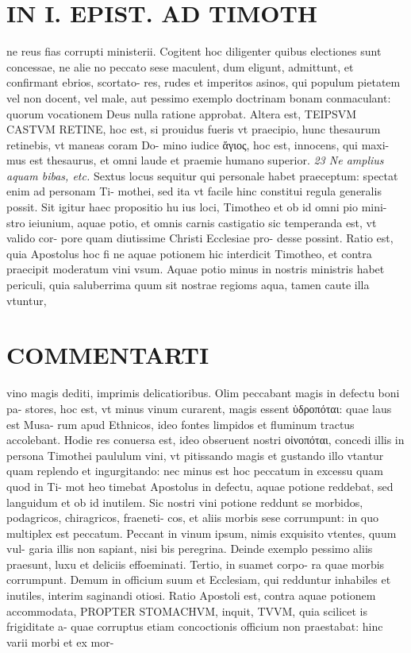 \documentclass{article}
\begin{document}
\begin{pages}
\section*{IN I. EPIST. AD TIMOTH }
\marginpar{[ p.139 ]}\pstart ne reus fias corrupti ministerii. Cogitent hoc diligenter quibus electiones sunt concessae, ne alie no peccato sese maculent, dum eligunt, admittunt, et confirmant ebrios, scortato- res, rudes et imperitos asinos, qui populum pietatem vel non docent, vel male, aut pessimo exemplo doctrinam bonam conmaculant: quorum vocationem Deus nulla ratione approbat.  \pend\pstart Altera est, TEIPSVM CASTVM RETINE, hoc est, si prouidus fueris vt praecipio, hunc thesaurum retinebis, vt maneas coram Do- mino iudice ἅγιος, hoc est, innocens, qui maxi- mus est thesaurus, et omni laude et praemie humano superior.  \pend
\textit{23 Ne amplius aquam bibas, etc. }\pstart Sextus locus sequitur qui personale habet praeceptum: spectat enim ad personam Ti- mothei, sed ita vt facile hinc constitui regula generalis possit. Sit igitur haec propositio hu ius loci, Timotheo et ob id omni pio mini- stro ieiunium, aquae potio, et omnis carnis castigatio sic temperanda est, vt valido cor- pore quam diutissime Christi Ecclesiae pro- desse possint. Ratio est, quia Apostolus hoc fi ne aquae potionem hic interdicit Timotheo, et contra praecipit moderatum vini vsum. Aquae potio minus in nostris ministris habet periculi, quia saluberrima quum sit nostrae regioms aqua, tamen caute illa vtuntur,  \pend
\marginpar{[ p.140 ]}
\section*{COMMENTARTI }\pstart vino magis dediti, imprimis delicatioribus. Olim peccabant magis in defectu boni pa- stores, hoc est, vt minus vinum curarent, magis essent ὑδροπόται: quae laus est Musa- rum apud Ethnicos, ideo fontes limpidos et fluminum tractus accolebant. Hodie res conuersa est, ideo obseruent nostri οἰνοπόται, concedi illis in persona Timothei paululum vini, vt pitissando magis et gustando illo vtantur quam replendo et ingurgitando: nec minus est hoc peccatum in excessu quam quod in Ti- mot heo timebat Apostolus in defectu, aquae potione reddebat, sed languidum et ob id inutilem. Sic nostri vini potione reddunt se morbidos, podagricos, chiragricos, fraeneti- cos, et aliis morbis sese corrumpunt: in quo multiplex est peccatum. Peccant in vinum ipsum, nimis exquisito vtentes, quum vul- garia illis non sapiant, nisi bis peregrina. Deinde exemplo pessimo aliis praesunt, luxu et deliciis effoeminati. Tertio, in suamet corpo- ra quae morbis corrumpunt. Demum in officium suum et Ecclesiam, qui redduntur inhabiles et inutiles, interim saginandi otiosi.  \pend\pstart Ratio Apostoli est, contra aquae potionem accommodata, PROPTER STOMACHVM, inquit, TVVM, quia scilicet is frigiditate a- quae corruptus etiam concoctionis officium non praestabat: hinc varii morbi et ex mor-  \pend

\end{pages}
\end{document}
